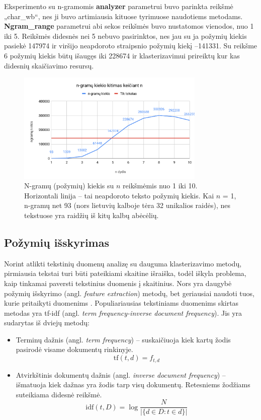 \documentclass{VUMIFInfBakalaurinis}
\begin{document}
Eksperimento su n-gramomis \textbf{analyzer} parametrui buvo parinkta
reikšmė „char\_wb“, nes ji buvo artimiausia kituose tyrimuose
naudotiems metodams. \textbf{Ngram\_range} parametrui abi sekos reikšmės
buvo nustatomos vienodos, nuo 1 iki 5. Reikšmės didesnės nei 5 nebuvo
pasirinktos, nes jau su ja požymių kiekis pasiekė 147974 ir viršijo
neapdoroto straipsnio požymių kiekį --141331. Su reikšme 6 požymių
kiekis būtų išaugęs iki 228674 ir klasterizavimui prireiktų kur kas
didesnių skaičiavimo resursų.

\begin{figure}[H]
	\centering
	\includegraphics[width=0.8\textwidth]{./img/image7.png}
	\caption{N-gramų (požymių) kiekis su $n$ reikšmėmis nuo 1 iki 10.\\
  Horizontali linija -- tai neapdoroto teksto požymių kiekis. Kai $n$
  = 1, n-gramų net 93 (nors lietuvių kalboje tėra 32 unikalios raidės),
  nes tekstuose yra raidžių iš kitų kalbų abėcėlių.}
  \label{nsize}
\end{figure}

\subsection{Požymių išskyrimas}\label{tfidf}

Norint atlikti tekstinių duomenų analizę su dauguma klasterizavimo
metodų, pirmiausia tekstai turi būti pateikiami skaitine išraiška, todėl
iškyla problema, kaip tinkamai paversti tekstinius duomenis į
skaitinius. Nors yra daugybė požymių išskyrimo (angl. \emph{feature
extraction}) metodų, bet geriausiai naudoti tuos, kurie pritaikyti
duomenims \cite{alelyani2013feature}. Populiariausias tekstiniams duomenims skirtas
metodas yra tf-idf (angl. \emph{term frequency-inverse document
frequency}). Jis yra sudarytas iš dviejų metodų:

\begin{itemize}
\item
  Terminų dažnis (angl. \emph{term frequency}) -- suskaičiuoja kiek
  kartų žodis pasirodė visame dokumentų rinkinyje.
  $$\mathrm{tf} (t,d)=f_{t,d}$$
\item
  Atvirkštinis dokumentų dažnis (angl. \emph{inverse document
  frequency}) -- išmatuoja kiek dažnas yra žodis tarp visų dokumentų.
  Retesniems žodžiams suteikiama didesnė reikšmė.
  $$\mathrm{idf}(t, D) =  \log \frac{N}{|\{d \in D: t \in d\}|}$$
\end{itemize}
\end{document}
